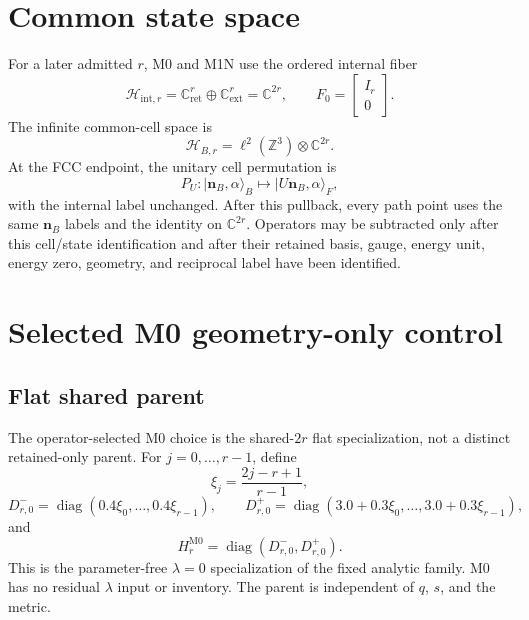 \documentclass[11pt]{article}
\newcommand{\CC}{\mathbb C}
\newcommand{\ZZ}{\mathbb Z}
\begin{document}
\section{Common state space}

For a later admitted $r$, M0 and M1N use the ordered internal fiber
\begin{equation}
 \mathcal H_{\mathrm{int},r}
 =\CC^r_{\mathrm{ret}}\oplus\CC^r_{\mathrm{ext}}
 =\CC^{2r},
 \qquad
 F_0=\begin{bmatrix}I_r\\0\end{bmatrix}.
\end{equation}
The infinite common-cell space is
\begin{equation}
 \mathcal H_{B,r}=\ell^2(\ZZ^3)\otimes\CC^{2r}.
\end{equation}
At the FCC endpoint, the unitary cell permutation is
\begin{equation}
 P_U:\lvert\mathbf n_B,\alpha\rangle_B
 \longmapsto\lvert U\mathbf n_B,\alpha\rangle_F,
\end{equation}
with the internal label unchanged.  After this pullback, every path point uses the same
$\mathbf n_B$ labels and the identity on $\CC^{2r}$.  Operators may be subtracted only
after this cell/state identification and after their retained basis, gauge, energy unit,
energy zero, geometry, and reciprocal label have been identified.

\section{Selected M0 geometry-only control}

\subsection{Flat shared parent}

The operator-selected M0 choice is the shared-$2r$ flat specialization, not a distinct
retained-only parent.  For $j=0,\ldots,r-1$, define
\begin{equation}
 \xi_j=\frac{2j-r+1}{r-1},
\end{equation}
\begin{equation}
 D^-_{r,0}=\operatorname{diag}(0.4\xi_0,\ldots,0.4\xi_{r-1}),
 \qquad
 D^+_{r,0}=\operatorname{diag}(3.0+0.3\xi_0,\ldots,3.0+0.3\xi_{r-1}),
\end{equation}
and
\begin{equation}
 H_r^{\mathrm{M0}}=\operatorname{diag}(D^-_{r,0},D^+_{r,0}).
\end{equation}
This is the parameter-free $\lambda=0$ specialization of the fixed analytic family.  M0
has no residual $\lambda$ input or inventory.  The parent is independent of $q$, $s$,
and the metric.
\end{document}
